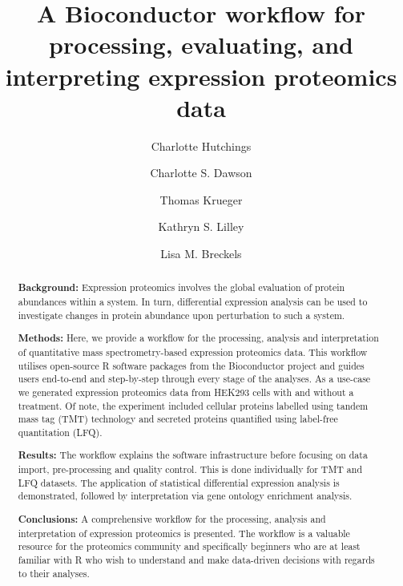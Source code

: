 \documentclass[9pt,a4paper,]{extarticle}
\begin{document}
\pagestyle{front}

\title{A Bioconductor workflow for processing, evaluating, and interpreting expression proteomics data}

\author[1]{Charlotte Hutchings}
\author[1]{Charlotte S. Dawson}
\author[2]{Thomas Krueger}
\author[1]{Kathryn S. Lilley}
\author[1]{Lisa M. Breckels}

\maketitle
\thispagestyle{front}

\begin{abstract}
\hfill\break
\textbf{Background:} Expression proteomics involves the global evaluation of protein
abundances within a system. In turn, differential expression analysis can be
used to investigate changes in protein abundance upon perturbation to such a
system.

\textbf{Methods:} Here, we provide a workflow for the processing, analysis and
interpretation of quantitative mass spectrometry-based expression proteomics
data. This workflow utilises open-source R software packages from the
Bioconductor project and guides users end-to-end and step-by-step through every
stage of the analyses. As a use-case we generated expression proteomics data
from HEK293 cells with and without a treatment. Of note, the experiment included
cellular proteins labelled using tandem mass tag (TMT) technology and secreted
proteins quantified using label-free quantitation (LFQ).

\textbf{Results:} The workflow explains the software infrastructure before focusing
on data import, pre-processing and quality control. This is done individually
for TMT and LFQ datasets. The application of statistical differential
expression analysis is demonstrated, followed by interpretation via gene
ontology enrichment analysis.

\textbf{Conclusions:} A comprehensive workflow for the processing, analysis and
interpretation of expression proteomics is presented. The workflow is a
valuable resource for the proteomics community and specifically beginners who
are at least familiar with R who wish to understand and make data-driven
decisions with regards to their analyses.
\end{abstract}
\end{document}
